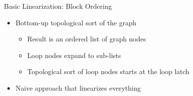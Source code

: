\begin{frame}{Basic Linearization: Block Ordering}

\begin{minipage}[t]{0.50\linewidth}

\begin{itemize}
    \item Bottom-up topological sort of the graph
    \begin{itemize}
        \item Result is an ordered list of graph nodes
        \item Loop nodes expand to sub-lists
        \item Topological sort of loop nodes starts at the loop latch
    \end{itemize}
    \item Naive approach that linearizes everything
\end{itemize}

\end{minipage}
\hspace{1em}
\begin{minipage}[t]{0.38\linewidth}

\vspace{0.1ex}


\end{minipage}

\end{frame}


